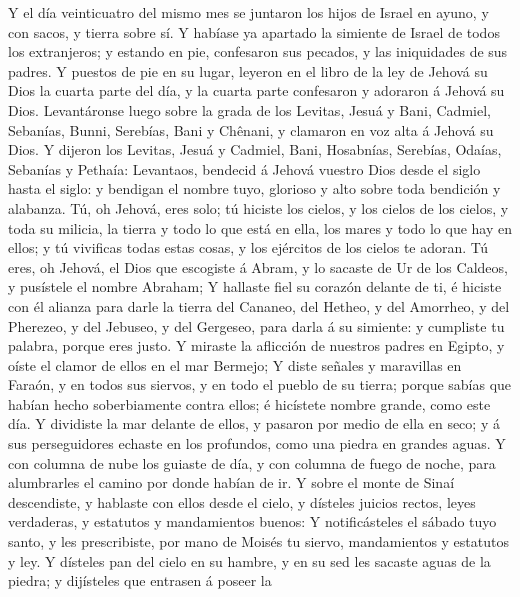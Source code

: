  Y el día veinticuatro del mismo mes se juntaron los hijos
de Israel en ayuno, y con sacos, y tierra sobre sí.  Y
habíase ya apartado la simiente de Israel de todos los extranjeros; y
estando en pie, confesaron sus pecados, y las iniquidades de sus padres.
 Y puestos de pie en su lugar, leyeron en el libro de la ley
de Jehová su Dios la cuarta parte del día, y la cuarta parte confesaron
y adoraron á Jehová su Dios.  Levantáronse luego sobre la
grada de los Levitas, Jesuá y Bani, Cadmiel, Sebanías, Bunni, Serebías,
Bani y Chênani, y clamaron en voz alta á Jehová su Dios.  Y
dijeron los Levitas, Jesuá y Cadmiel, Bani, Hosabnías, Serebías, Odaías,
Sebanías y Pethaía: Levantaos, bendecid á Jehová vuestro Dios desde el
siglo hasta el siglo: y bendigan el nombre tuyo, glorioso y alto sobre
toda bendición y alabanza.  Tú, oh Jehová, eres solo; tú
hiciste los cielos, y los cielos de los cielos, y toda su milicia, la
tierra y todo lo que está en ella, los mares y todo lo que hay en ellos;
y tú vivificas todas estas cosas, y los ejércitos de los cielos te
adoran.  Tú eres, oh Jehová, el Dios que escogiste á Abram,
y lo sacaste de Ur de los Caldeos, y pusístele el nombre Abraham;
 Y hallaste fiel su corazón delante de ti, é hiciste con él
alianza para darle la tierra del Cananeo, del Hetheo, y del Amorrheo, y
del Pherezeo, y del Jebuseo, y del Gergeseo, para darla á su simiente: y
cumpliste tu palabra, porque eres justo.  Y miraste la
aflicción de nuestros padres en Egipto, y oíste el clamor de ellos en el
mar Bermejo;  Y diste señales y maravillas en Faraón, y en
todos sus siervos, y en todo el pueblo de su tierra; porque sabías que
habían hecho soberbiamente contra ellos; é hicístete nombre grande, como
este día.  Y dividiste la mar delante de ellos, y pasaron
por medio de ella en seco; y á sus perseguidores echaste en los
profundos, como una piedra en grandes aguas.  Y con columna
de nube los guiaste de día, y con columna de fuego de noche, para
alumbrarles el camino por donde habían de ir.  Y sobre el
monte de Sinaí descendiste, y hablaste con ellos desde el cielo, y
dísteles juicios rectos, leyes verdaderas, y estatutos y mandamientos
buenos:  Y notificásteles el sábado tuyo santo, y les
prescribiste, por mano de Moisés tu siervo, mandamientos y estatutos y
ley.  Y dísteles pan del cielo en su hambre, y en su sed
les sacaste aguas de la piedra; y dijísteles que entrasen á poseer la
